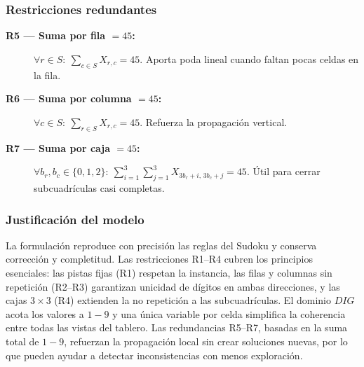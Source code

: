 \subsubsection*{Restricciones redundantes}
\begin{description}
  \item[\textbf{R5 — Suma por fila \(=45\):}] \(\forall r\in S:\ \sum_{c\in S}X_{r,c}=45\). Aporta poda lineal cuando faltan pocas celdas en la fila.
  \item[\textbf{R6 — Suma por columna \(=45\):}] \(\forall c\in S:\ \sum_{r\in S}X_{r,c}=45\). Refuerza la propagación vertical.
  \item[\textbf{R7 — Suma por caja \(=45\):}] \(\forall b_r,b_c\in\{0,1,2\}:\ \sum_{i=1}^{3}\sum_{j=1}^{3}X_{3b_r+i,\,3b_c+j}=45\). Útil para cerrar subcuadrículas casi completas.
\end{description}

\subsubsection*{Justificación del modelo}
La formulación reproduce con precisión las reglas del Sudoku y conserva corrección y completitud. Las restricciones R1–R4 cubren los principios esenciales: las pistas fijas (R1) respetan la instancia, las filas y columnas sin repetición (R2–R3) garantizan unicidad de dígitos en ambas direcciones, y las cajas \(3\times3\) (R4) extienden la no repetición a las subcuadrículas. El dominio \(DIG\) acota los valores a \(1\!-\!9\) y una única variable por celda simplifica la coherencia entre todas las vistas del tablero. Las redundancias R5–R7, basadas en la suma total de \(1\!-\!9\), refuerzan la propagación local sin crear soluciones nuevas, por lo que pueden ayudar a detectar inconsistencias con menos exploración.
